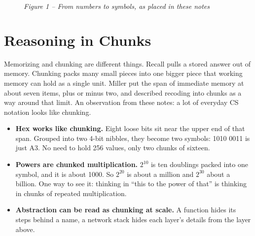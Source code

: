 \documentclass[11pt,a4paper]{article}
\begin{document}
\begin{figure}[H]
\centering
{}
\caption*{\itshape Figure 1 -- From numbers to symbols, as placed in these notes}
\end{figure}

\section{Reasoning in Chunks}

Memorizing and chunking are different things. Recall pulls a stored answer out of memory.
Chunking packs many small pieces into one bigger piece that working memory can hold as a
single unit. Miller put the span of immediate memory at about seven items, plus or minus two,
and described recoding into chunks as a way around that limit. \cite{miller} An observation from these
notes: a lot of everyday CS notation looks like chunking.

\newpage %
\begin{itemize}
  \item \textbf{Hex works like chunking.} Eight loose bits sit near the upper end of that span. Grouped
        into two 4-bit nibbles, they become two symbols: 1010 0011 is just A3. No need to hold
        256 values, only two chunks of sixteen.
  \item \textbf{Powers are chunked multiplication.} $2^{10}$ is ten doublings packed into one symbol, and it
        is about 1000. So $2^{20}$ is about a million and $2^{30}$ about a billion. One way to see it: thinking
        in ``this to the power of that'' is thinking in chunks of repeated multiplication.
  \item \textbf{Abstraction can be read as chunking at scale.} A function hides its steps behind a name,
        a network stack hides each layer's details from the layer above.
\end{itemize}
\end{document}
